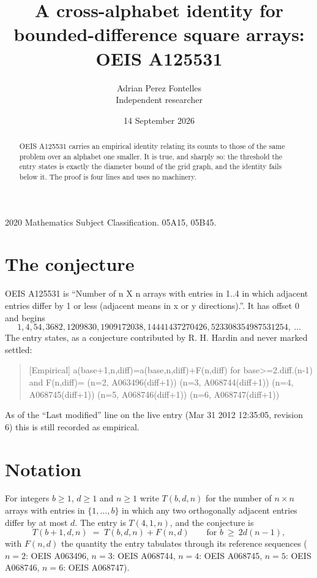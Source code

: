 \documentclass[11pt,a4paper]{article}
\title{A cross-alphabet identity for bounded-difference square arrays: OEIS A125531}
\author{Adrian Perez Fontelles\\ \small Independent researcher}
\date{14 September 2026}
\theoremstyle{plain}
\theoremstyle{definition}
\begin{document}
\maketitle

\begin{abstract}
OEIS A125531 carries an empirical identity relating its counts to those of the same problem over an
alphabet one smaller. It is true, and sharply so: the threshold the entry states is exactly the
diameter bound of the grid graph, and the identity fails below it. The proof is four lines and
uses no machinery.
\end{abstract}

\noindent\small 2020 Mathematics Subject Classification. 05A15, 05B45.\normalsize

\section{The conjecture}

OEIS A125531 is ``Number of n X n arrays with entries in 1..4 in which adjacent entries differ by 1 or less (adjacent means in x or y directions).''. It has offset $0$ and begins
\[
1, 4, 54, 3682, 1209830, 1909172038, 14441437270426, 523308354987531254,\ \dots
\]
The entry states, as a conjecture contributed by R. H. Hardin and never marked settled:
\begin{quote}
[Empirical] a(base+1,n,diff)=a(base,n,diff)+F(n,diff) for base>=2.diff.(n-1) and F(n,diff)= (n=2, A063496(diff+1)) (n=3, A068744(diff+1)) (n=4, A068745(diff+1)) (n=5, A068746(diff+1)) (n=6, A068747(diff+1))
\end{quote}
As of the ``Last modified'' line on the live entry (Mar 31 2012 12:35:05, revision 6)
this is still recorded as empirical.

\section{Notation}

For integers $b\ge1$, $d\ge1$ and $n\ge1$ write $T(b,d,n)$ for the number of $n\times n$ arrays
with entries in $\{1,\dots,b\}$ in which any two orthogonally adjacent entries differ by at
most $d$. The entry is $T(4,1,n)$, and the conjecture is
\[
T(b+1,d,n)\;=\;T(b,d,n)+F(n,d)\qquad\text{for } b\ \ge\ 2d(n-1),
\]
with $F(n,d)$ the quantity the entry tabulates through its reference sequences ($n=2$: OEIS A063496, $n=3$: OEIS A068744, $n=4$: OEIS A068745, $n=5$: OEIS A068746, $n=6$: OEIS A068747).
\end{document}

